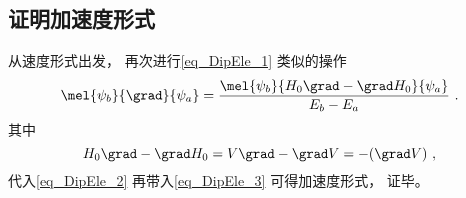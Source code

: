 \subsection{证明加速度形式}
从速度形式出发， 再次进行\autoref{eq_DipEle_1} 类似的操作
\begin{equation}\label{eq_DipEle_2}
\mel{\psi_b}{\grad}{\psi_a} = \frac{\mel{\psi_b}{H_0\grad - \grad H_0}{\psi_a}}{E_b - E_a}~.
\end{equation}
其中
\begin{equation}
H_0\grad - \grad H_0 = V\grad - \grad V = -(\grad V)~,
\end{equation}
代入\autoref{eq_DipEle_2} 再带入\autoref{eq_DipEle_3} 可得加速度形式， 证毕。
